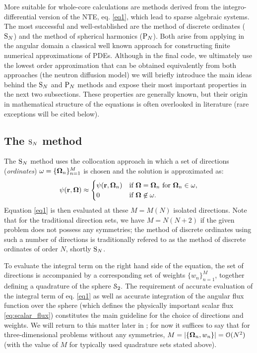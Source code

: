 \vspace*{1em}
More suitable for whole-core calculations are methods derived from the integro-differential
version of the NTE, eq.
\eqref{eq1}, which lead to sparse algebraic systems. The most successful and well-established are the method
of discrete ordinates ($\text{S}_{N}$) and the method of spherical harmonics ($\text{P}_{N}$).
Both arise from applying in the
angular domain a classical well known approach for constructing finite numerical
approximations of PDEs. Although in the final code, we ultimately use the lowest order approximation that can be obtained
equivalently from both approaches (the neutron diffusion model) we will briefly introduce the main ideas behind the
$\text{S}_{N}$ and $\text{P}_{N}$ methods and expose their most important properties in the next two subsections. These properties are
generally known, but their origin in mathematical structure of the equations is often overlooked in literature (rare
exceptions will be cited below). 

\subsection{The $\text{S}_{N}$ method}\label{sec:1-SN}
The $\text{S}_{N}$ method uses the collocation approach in which a set of directions (\textit{ordinates})
$\omega = \{\mathbf{\Omega}_n\}_{n=1}^{M}$ is chosen and the solution is approximated as:
\begin{equation}\label{eq:sn_approx} 
	\psi(\mathbf{r}, \mathbf{\Omega}) \approx 
		\begin{cases}\displaystyle \psi(\mathbf{r},\mathbf{\Omega}_n) & \mbox{if $\mathbf{\Omega} = \mathbf{\Omega}_n$ for $\mathbf{\Omega}_n \in \omega$},\\ 0 & \mbox{if $\mathbf{\Omega} \not \in \omega$.} \end{cases} 
\end{equation}
Equation \eqref{eq1} is then evaluated at these $M = M(N)$ isolated directions.
Note that for the traditional direction sets, we have $M = N(N+2)$ if the given problem does not possess any symmetries; the
method of discrete ordinates using such a number of directions is traditionally refered to as the method of discrete
ordinates of order $N$, shortly $\text{S}_{N}$. 

To evaluate the integral term on the right hand side of the equation, the set of directions is accompanied by a
corresponding set of weights $\{w_n\}_{n=1}^{M}$, together defining a quadrature of the sphere $\mathcal{S}_2.$ The
requirement of accurate evaluation of the integral term of eq.
\eqref{eq1} as well as accurate integration of the angular flux function over the sphere (which defines the
physically important scalar flux \eqref{eq:scalar_flux}) constitutes the main guideline for the choice of
directions and weights. We will return to this matter later in ; for now it suffices to say that for
three-dimensional problems without any symmetries, \mbox{$M = \left|\{\mathbf{\Omega}_n, w_n\}\right| = \mathcal{O}(N^2)$} (with the
value of $M$ for typically used quadrature sets stated above).

